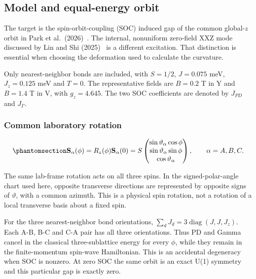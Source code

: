 \clearpage

\subsection{Model and equal-energy orbit}\label{sec-orbit}

The target is the spin-orbit-coupling (SOC) induced gap of the common
global-\(z\) orbit in Park et
al.~(2026)~\cite{park2026}. The internal, nonuniform zero-field XXZ mode discussed by
Lin and Shi (2025)~\cite{lin2025} is a
different excitation. That distinction is essential when choosing the
deformation used to calculate the curvature.

Only nearest-neighbor bonds are included, with \(S=1/2\), \(J=0.075\)
meV, \(J_z=0.125\) meV and \(T=0\). The representative fields are
\(B=0.2\) T in Y and \(B=1.4\) T in V, with \(g_z=4.645\). The two SOC
coefficients are denoted by \(J_{PD}\) and \(J_\Gamma\).

\subsubsection{Common laboratory
rotation}\label{common-laboratory-rotation}

\begin{equation}\phantomsection\label{eq-lswt-yv-pg-orbit}{
\mathbf S_\alpha(\phi)=R_z(\phi)\mathbf S_\alpha(0)
=S\begin{pmatrix}
\sin\vartheta_\alpha\cos\phi\\
\sin\vartheta_\alpha\sin\phi\\
\cos\vartheta_\alpha
\end{pmatrix},\qquad \alpha=A,B,C.
}\end{equation}

The same lab-frame rotation acts on all three spins. In the
signed-polar-angle chart used here, opposite transverse directions are
represented by opposite signs of \(\vartheta\), with a common azimuth.
This is a physical spin rotation, not a rotation of a local transverse
basis about a fixed spin.

For the three nearest-neighbor bond orientations,
\(\sum_d J_d=3\operatorname{diag}(J,J,J_z)\). Each A-B, B-C and C-A pair
has all three orientations. Thus PD and Gamma cancel in the classical
three-sublattice energy for every \(\phi\), while they remain in the
finite-momentum spin-wave Hamiltonian. This is an accidental degeneracy
when SOC is nonzero. At zero SOC the same orbit is an exact U(1)
symmetry and this particular gap is exactly zero.

